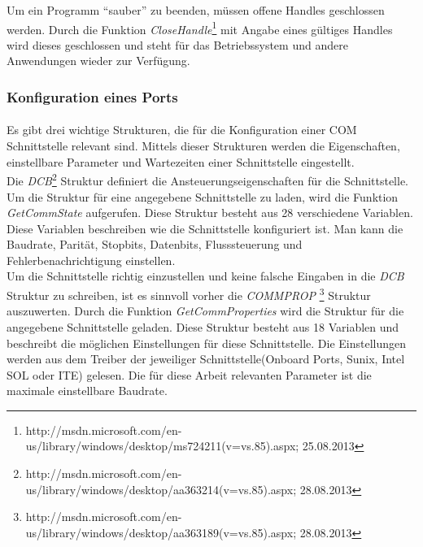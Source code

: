 Um ein Programm "`sauber"' zu beenden, müssen offene Handles geschlossen werden. Durch die Funktion \textit{CloseHandle}\footnote{http://msdn.microsoft.com/en-us/library/windows/desktop/ms724211(v=vs.85).aspx; 25.08.2013} mit Angabe eines gültiges Handles wird dieses geschlossen und steht für das Betriebssystem und andere Anwendungen wieder zur Verfügung.


\subsubsection{Konfiguration eines Ports}
\paragraph{}
Es gibt drei wichtige Strukturen, die für die Konfiguration einer COM Schnittstelle relevant sind. Mittels dieser Strukturen werden die Eigenschaften, einstellbare Parameter und Wartezeiten einer Schnittstelle eingestellt.
\\

Die \textit{DCB}\footnote{http://msdn.microsoft.com/en-us/library/windows/desktop/aa363214(v=vs.85).aspx; 28.08.2013} Struktur definiert die Ansteuerungseigenschaften für die Schnittstelle. Um die Struktur für eine angegebene Schnittstelle zu laden, wird die Funktion \textit{GetCommState} aufgerufen. Diese Struktur besteht aus 28 verschiedene Variablen. Diese Variablen beschreiben wie die Schnittstelle konfiguriert ist. Man kann die Baudrate, Parität, Stopbits, Datenbits, Flusssteuerung und Fehlerbenachrichtigung einstellen.
\\

Um die Schnittstelle richtig einzustellen und keine falsche Eingaben in die \textit{DCB} Struktur zu schreiben, ist es sinnvoll vorher die \textit{COMMPROP} \footnote{http://msdn.microsoft.com/en-us/library/windows/desktop/aa363189(v=vs.85).aspx; 28.08.2013} Struktur auszuwerten. Durch die Funktion \textit{GetCommProperties} wird die Struktur für die angegebene Schnittstelle geladen. Diese Struktur besteht aus 18 Variablen und beschreibt die möglichen Einstellungen für diese Schnittstelle. Die Einstellungen werden aus dem Treiber der jeweiliger Schnittstelle(Onboard Ports, Sunix, Intel SOL oder ITE) gelesen. Die für diese Arbeit relevanten Parameter ist die maximale einstellbare Baudrate.
\\

